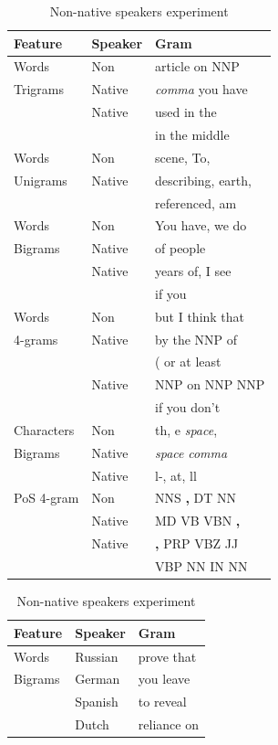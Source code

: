 \documentclass[10pt,a5paper,twoside]{article}
\begin{document}
\begin{table}[t]
  \begin{subtable}[]{0.5\textwidth}
    \begin{tabular}{l|ll|}
     \textbf{Feature} & \textbf{Speaker}  & \textbf{Gram}
     \\\hline
     Words & Non&article on NNP\\
     Trigrams& Native&  \emph{comma} you have\\\cline{2-3}
             & Native& used in the\\
             &  &in the middle\\\hline
       Words &Non& scene, To,\\
     Unigrams&Native&describing, earth,\\\cline{2-3}
             && referenced, am\\\hline
      Words  &Non& You have, we do\\
      Bigrams&Native& of people\\\cline{2-3}
             &Native& years of, I see\\
             &&if you\\\hline
       Words &Non& but I think that\\
     4-grams  &Native&by the NNP of\\\cline{2-3}
              &&( or at least\\
              &Native&NNP on NNP NNP\\
              &&if you don't\\\hline
    Characters&Non& th, e \emph{space},\\
         Bigrams &Native& \emph{space} \emph{comma}\\ \cline{2-3}
                 &Native& l-, at, ll\\\hline
      PoS 4-gram &Non& NNS \textbf{,} DT NN\\
                 &Native& MD VB VBN \textbf{,}\\\cline{2-3}
                 &Native& \textbf{,} PRP VBZ JJ\\
                 && VBP NN IN NN\\
      \end{tabular}
    \label{table:nonnative}
    \caption{Non-native speakers experiment}
  \end{subtable}
  \begin{subtable}[]{0.5\textwidth}
   \begin{tabular}{l|ll}
    \textbf{Feature} & \textbf{Speaker}  & \textbf{Gram}
   \\\hline
   Words & Russian &prove that\\
    Bigrams& German& you leave\\
    & Spanish& to reveal\\
    & Dutch & reliance on\\\hline


\end{tabular}
\end{subtable}
\end{table}
\end{document}
